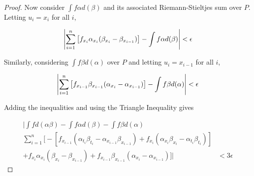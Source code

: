 \documentclass{amsart}
\DeclarePairedDelimiter{\abs}{\lvert}{\rvert}
\begin{document}
\begin{proof}
Now consider $\int f\alpha d(\beta)$ and its associated Riemann-Stieltjes sum over $P$. Letting $u_i = x_i$ for all $i$,

\[
\abs*{ \sum_{i=1}^n \left[f_{x_i}\alpha_{x_i}(\beta_{x_i} - \beta_{x_{i-1}})\right]
- \int f\alpha d(\beta)}
< \epsilon
\]

Similarly, considering $\int f\beta d(\alpha)$ over $P$ and letting $u_i = x_{i-1}$ for all $i$,

\[
\abs*{ \sum_{i=1}^n \left[f_{x_{i-1}}\beta_{x_{i-1}}(\alpha_{x_i} - \alpha_{x_{i-1}})\right]
- \int f\beta d(\alpha)}
< \epsilon
\]

Adding the inequalities and using the Triangle Inequality gives

\begin{align*}
\bigg|
\int f d(\alpha\beta) - \int f\alpha d(\beta) - \int f\beta d(\alpha) & \\
\sum_{i=1}^n \Big[
-\left[f_{x_{i-1}}(\alpha_{t_i}\beta_{t_i} - \alpha_{x_{i-1}}\beta_{x_{i-1}})
+ f_{x_i}(\alpha_{x_i}\beta_{x_i} - \alpha_{t_i}\beta_{t_i}) \right] & \\
+ f_{x_i}\alpha_{x_i}(\beta_{x_i} - \beta_{x_{i-1}})
+ f_{x_{i-1}}\beta_{x_{i-1}}(\alpha_{x_i} - \alpha_{x_{i-1}})
\Big] \bigg| &
< 3\epsilon
\end{align*}

\end{proof}
\end{document}
